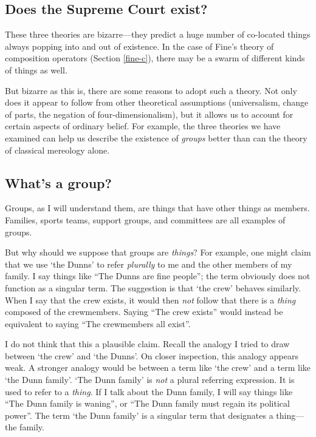 \documentclass[12pt,twoside]{reedfancy}
\begin{document}
\begin{spacing}{1.25}
\section{Does the Supreme Court exist?}
\label{groups}
These three theories are bizarre---they predict a huge number of
co-located things always popping into and out of existence.  In the
case of Fine's theory of composition operators (Section \ref{fine-c}),
there may be a swarm of different kinds of things as well.  

But bizarre as this is, there are some reasons to adopt such a theory.
Not only does it appear to follow from other theoretical assumptions
(universalism, change of parts, the negation of four-dimensionalism),
but it allows us to account for certain aspects of ordinary belief.
For example, the three theories we have examined can help us describe
the existence of {\em groups} better than can the theory of classical
mereology alone.

\subsection{What's a group?}
\label{what-g}
Groups, as I will understand them, are things that have other things
as members.  Families, sports teams, support groups, and committees
are all examples of groups.

But why should we suppose that groups are {\em things}?  For example,
one might claim that we use `the Dunns' to refer {\em plurally} to me
and the other members of my family.  I say things like ``The Dunns are
fine people''; the term obviously does not function as a singular
term.  The suggestion is that `the crew' behaves similarly.  When I
say that the crew exists, it would then {\em not} follow that there is
a {\em thing} composed of the crewmembers.  Saying ``The crew exists''
would instead be equivalent to saying ``The crewmembers all exist''.

I do not think that this a plausible claim.  Recall the analogy I
tried to draw between `the crew' and `the Dunns'.  On closer
inspection, this analogy appears weak.  A stronger analogy would be
between a term like `the crew' and a term like `the Dunn family'.
`The Dunn family' is {\em not} a plural referring expression.  It is
used to refer to a {\em thing}.  If I talk about the Dunn family, I
will say things like ``The Dunn family is waning'', or ``The Dunn
family must regain its political power''.  The term `the Dunn family'
is a singular term that designates a thing---the family.


\end{spacing}
\end{document}
